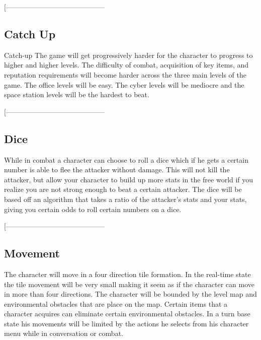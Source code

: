 \documentclass[9pt]{article}
\begin{document}
[------------------------------------------
\smallskip












\subsection*{Catch Up}
Catch-up
The game will get progressively harder for the character to progress to higher and higher levels. The difficulty of combat, acquisition of key items, and reputation requirements will become harder across the three main levels of the game. The office levels will be easy. The cyber levels will be mediocre and the space station levels will be the hardest to beat.

[------------------------------------------
\smallskip










\subsection*{Dice}
While in combat a character can choose to roll a dice which if he gets a certain number is able to flee the attacker without damage. This will not kill the attacker, but allow your character to build up more stats in the free world if you realize you are not strong enough to beat a certain attacker. The dice will be based off an algorithm that takes a ratio of the attacker’s stats and your stats, giving you certain odds to roll certain numbers on a dice.

[------------------------------------------
\smallskip










\subsection*{Movement}
The character will move in a four direction tile formation. In the real-time state the tile movement will be very small making it seem as if the character can move in more than four directions. The character will be bounded by the level map and environmental obstacles that are place on the map. Certain items that a character acquires can eliminate certain environmental obstacles. In a turn base state his movements will be limited by the actions he selects from his character menu while in conversation or combat.
\end{document}
